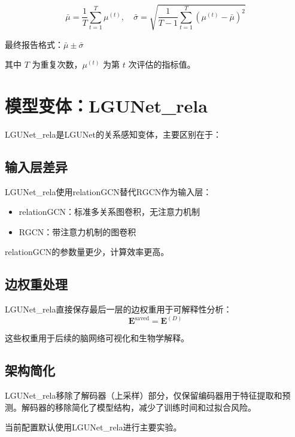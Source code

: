 \begin{equation}
\bar{\mu} = \frac{1}{T} \sum_{t=1}^{T} \mu^{(t)}, \quad \bar{\sigma} = \sqrt{ \frac{1}{T-1} \sum_{t=1}^{T} (\mu^{(t)} - \bar{\mu})^2 }
\end{equation}

最终报告格式：$\bar{\mu} \pm \bar{\sigma}$

其中 $T$ 为重复次数，$\mu^{(t)}$ 为第 $t$ 次评估的指标值。

\newpage

\section{模型变体：LGUNet\_rela}

LGUNet\_rela是LGUNet的关系感知变体，主要区别在于：

\subsection{输入层差异}

LGUNet\_rela使用relationGCN替代RGCN作为输入层：
\begin{itemize}
    \item relationGCN：标准多关系图卷积，无注意力机制
    \item RGCN：带注意力机制的图卷积
\end{itemize}

relationGCN的参数量更少，计算效率更高。

\subsection{边权重处理}

LGUNet\_rela直接保存最后一层的边权重用于可解释性分析：
\begin{equation}
\mathbf{E}^{\text{saved}} = \mathbf{E}^{(D)}
\end{equation}

这些权重用于后续的脑网络可视化和生物学解释。

\subsection{架构简化}

LGUNet\_rela移除了解码器（上采样）部分，仅保留编码器用于特征提取和预测。解码器的移除简化了模型结构，减少了训练时间和过拟合风险。

当前配置默认使用LGUNet\_rela进行主要实验。

\newpage

